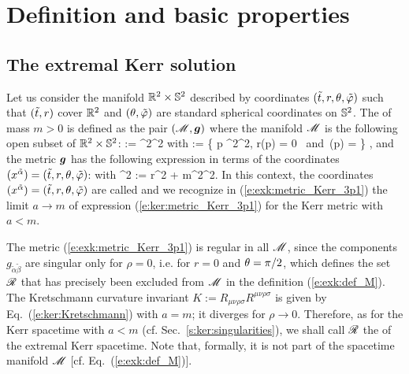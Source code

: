 \section{Definition and basic properties}

\subsection{The extremal Kerr solution}

Let us consider the manifold $\mathbb{R}^2\times\mathbb{S}^2$ described by
coordinates $({\tilde t}, r, \theta,{\tilde\varphi})$ such that $({\tilde t},r)$ cover $\mathbb{R}^2$
and $(\theta,{\tilde\varphi})$ are standard spherical coordinates on $\mathbb{S}^2$.
The 
of mass $m>0$ is defined as the pair $(\mathscr{M}, \bm{g})$ where the manifold $\mathscr{M}$ is the following open subset of $\mathbb{R}^2\times\mathbb{S}^2$:
\be \label{e:exk:def_M}
 \M := \R^2\times\SS^2 \setminus \ring
\ee
with
\be \label{e:exk:def_ring}
    \ring := \left\{ p \in \R^2\times\SS^2,
        \quad r(p) = 0 \ \mbox{and}\ \th(p) =  \right\} ,
\ee
and the metric $\bm{g}$ has the following expression in terms of the coordinates
$(x^{\tilde{\alpha}}) = ({\tilde t}, r, \theta,{\tilde\varphi})$:
\be \label{e:exk:metric_Kerr_3p1}
\ee
with
\be
    \rho^2 := r^2 + m^2\cos^2\th .
\ee
In this context, the coordinates $(x^{\tilde{\alpha}}) = ({\tilde t}, r, \theta,{\tilde\varphi})$
are called
and we recognize in (\ref{e:exk:metric_Kerr_3p1}) the limit $a\to m$ of
expression (\ref{e:ker:metric_Kerr_3p1}) for the Kerr metric with $a< m$.

The metric (\ref{e:exk:metric_Kerr_3p1}) is regular
in all $\mathscr{M}$, since the components $g_{\tilde{\alpha}\tilde{\beta}}$ are singular only
for $\rho=0$, i.e. for $r=0$ and $\theta=\pi/2$, which defines  the set $\mathscr{R}$ that has precisely been excluded from $\mathscr{M}$ in
the definition (\ref{e:exk:def_M}). The Kretschmann curvature
invariant $K := R_{\mu\nu\rho\sigma} R^{\mu\nu\rho\sigma}$
is given by Eq.~(\ref{e:ker:Kretschmann}) with $a=m$; it diverges for $\rho\to 0$. Therefore, as
for the Kerr spacetime with $a<m$ (cf. Sec.~\ref{s:ker:singularities}), we shall call $\mathscr{R}$ the 
of the extremal Kerr spacetime. Note that, formally, it is not part of the spacetime manifold
$\mathscr{M}$ [cf. Eq.~(\ref{e:exk:def_M})].

